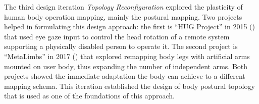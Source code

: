 


The third design iteration \textit{Topology Reconfiguration} explored the plasticity of human body operation mapping, mainly the postural mapping. Two projects helped in formulating this design approach: the first is ``HUG Project'' in 2015 () that used eye gaze input to control the head rotation of a remote system supporting a physically disabled person to operate it. The second project is ``MetaLimbs'' in 2017 () that explored remapping body legs with artificial arms mounted on user body, thus expanding the number of independent arms. Both projects showed the immediate adaptation the body can achieve to a different mapping schema. This iteration established the design of body postural topology that is used as one of the foundations of this approach.

